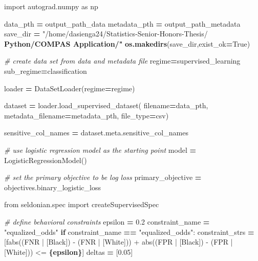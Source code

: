 \documentclass[12pt, twoside]{amherstthesis}
\newenvironment{Shaded}{\begin{snugshade}}{\end{snugshade}}
\newcommand{\CommentTok}[1]{\textcolor[rgb]{0.56,0.35,0.01}{\textit{#1}}}
\newcommand{\ControlFlowTok}[1]{\textcolor[rgb]{0.13,0.29,0.53}{\textbf{#1}}}
\newcommand{\ErrorTok}[1]{\textcolor[rgb]{0.64,0.00,0.00}{\textbf{#1}}}
\newcommand{\FloatTok}[1]{\textcolor[rgb]{0.00,0.00,0.81}{#1}}
\newcommand{\ImportTok}[1]{#1}
\newcommand{\NormalTok}[1]{#1}
\newcommand{\OperatorTok}[1]{\textcolor[rgb]{0.81,0.36,0.00}{\textbf{#1}}}
\newcommand{\SpecialCharTok}[1]{\textcolor[rgb]{0.81,0.36,0.00}{\textbf{#1}}}
\newcommand{\SpecialStringTok}[1]{\textcolor[rgb]{0.31,0.60,0.02}{#1}}
\newcommand{\StringTok}[1]{\textcolor[rgb]{0.31,0.60,0.02}{#1}}
\newcommand{\VariableTok}[1]{\textcolor[rgb]{0.00,0.00,0.00}{#1}}
\begin{document}
\begin{Shaded}
\begin{Highlighting}[]
\ImportTok{import}\NormalTok{ autograd.numpy }\ImportTok{as}\NormalTok{ np}

\NormalTok{data\_pth }\OperatorTok{=}\NormalTok{ output\_path\_data}
\NormalTok{metadata\_pth }\OperatorTok{=}\NormalTok{ output\_path\_metadata}
\NormalTok{save\_dir }\OperatorTok{=} \StringTok{"/home/dasienga24/Statistics{-}Senior{-}Honors{-}Thesis/\textquotesingle{}}
\ErrorTok{\textquotesingle{}Python/COMPAS Application/"}
\ErrorTok{os.makedirs}\NormalTok{(save\_dir,exist\_ok}\OperatorTok{=}\VariableTok{True}\NormalTok{)}

\CommentTok{\# create data set from data and metadata file}
\NormalTok{regime}\OperatorTok{=}\StringTok{\textquotesingle{}supervised\_learning\textquotesingle{}}
\NormalTok{sub\_regime}\OperatorTok{=}\StringTok{\textquotesingle{}classification\textquotesingle{}}

\NormalTok{loader }\OperatorTok{=}\NormalTok{ DataSetLoader(regime}\OperatorTok{=}\NormalTok{regime)}

\NormalTok{dataset }\OperatorTok{=}\NormalTok{ loader.load\_supervised\_dataset(}
\NormalTok{  filename}\OperatorTok{=}\NormalTok{data\_pth,}
\NormalTok{  metadata\_filename}\OperatorTok{=}\NormalTok{metadata\_pth,}
\NormalTok{  file\_type}\OperatorTok{=}\StringTok{\textquotesingle{}csv\textquotesingle{}}\NormalTok{)}
  
\NormalTok{sensitive\_col\_names }\OperatorTok{=}\NormalTok{ dataset.meta.sensitive\_col\_names}

\CommentTok{\# use logistic regression model as the starting point}
\NormalTok{model }\OperatorTok{=}\NormalTok{ LogisticRegressionModel()}
    
\CommentTok{\# set the primary objective to be log loss}
\NormalTok{primary\_objective }\OperatorTok{=}\NormalTok{ objectives.binary\_logistic\_loss}

\ImportTok{from}\NormalTok{ seldonian.spec }\ImportTok{import}\NormalTok{ createSupervisedSpec}

\CommentTok{\# define behavioral constraints}
\NormalTok{epsilon }\OperatorTok{=} \FloatTok{0.2}
\NormalTok{constraint\_name }\OperatorTok{=} \StringTok{"equalized\_odds"}
\ControlFlowTok{if}\NormalTok{ constraint\_name }\OperatorTok{==} \StringTok{"equalized\_odds"}\NormalTok{:}
\NormalTok{  constraint\_strs }\OperatorTok{=}\NormalTok{ [}\SpecialStringTok{f\textquotesingle{}abs((FNR | [Black]) {-} (FNR | [White]))\textquotesingle{}} 
  \StringTok{\textquotesingle{}+ abs((FPR | [Black]) {-} (FPR | [White])) \textless{}= }\SpecialCharTok{\{epsilon\}}\StringTok{\textquotesingle{}}\NormalTok{] }
\NormalTok{deltas }\OperatorTok{=}\NormalTok{ [}\FloatTok{0.05}\NormalTok{]}


\end{Highlighting}
\end{Shaded}
\end{document}
